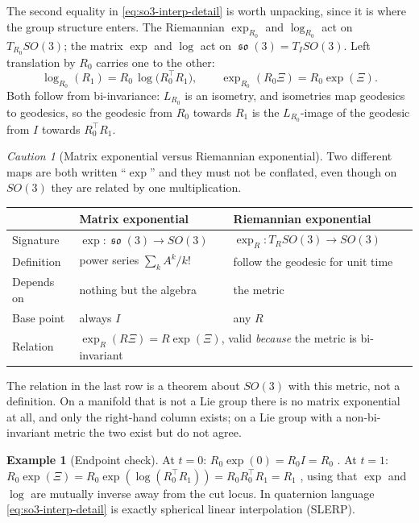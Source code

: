 \documentclass[11pt,a4paper]{report}
\theoremstyle{definition}
\newtheorem{example}[example]{Example}
\theoremstyle{remark}
\newtheorem{caution}[caution]{Caution}
\DeclareMathOperator{\so}{\mathfrak{so}}
\begin{document}
The second equality in \eqref{eq:so3-interp-detail} is worth unpacking,
since it is where the group structure enters. The Riemannian
$\exp_{R_0}$ and $\log_{R_0}$ act on $T_{R_0}SO(3)$; the matrix $\exp$ and
$\log$ act on $\so(3)=T_ISO(3)$. Left translation by $R_0$ carries one to
the other:
\[
\log_{R_0}(R_1) = R_0\,\log\bigl(R_0^\top R_1\bigr) ,
\qquad
\exp_{R_0}(R_0\Xi) = R_0\exp(\Xi) .
\]
Both follow from bi-invariance: $L_{R_0}$ is an isometry, and isometries
map geodesics to geodesics, so the geodesic from $R_0$ towards $R_1$ is the
$L_{R_0}$-image of the geodesic from $I$ towards $R_0^\top R_1$.

\begin{caution}[Matrix exponential versus Riemannian exponential]
\label{caution:two-exponentials}
Two different maps are both written ``$\exp$'' and they must not be
conflated, even though on $SO(3)$ they are related by one multiplication.
\begin{center}
\begin{tabular}{lll}
\toprule
& Matrix exponential & Riemannian exponential \\
\midrule
Signature & $\exp:\so(3)\to SO(3)$ & $\exp_R:T_RSO(3)\to SO(3)$ \\
Definition & power series $\sum_k A^k/k!$ & follow the geodesic for unit time \\
Depends on & nothing but the algebra & the metric \\
Base point & always $I$ & any $R$ \\
Relation & \multicolumn{2}{p{8.6cm}}{$\exp_R(R\Xi)=R\exp(\Xi)$, valid \emph{because} the metric is bi-invariant} \\
\bottomrule
\end{tabular}
\end{center}
The relation in the last row is a theorem about $SO(3)$ with this metric,
not a definition. On a manifold that is not a Lie group there is no matrix
exponential at all, and only the right-hand column exists; on a Lie group
with a non-bi-invariant metric the two exist but do not agree.
\end{caution}

\begin{example}[Endpoint check]
\label{ex:so3-endpoints}
At $t=0$: $R_0\exp(0)=R_0I=R_0$ \checkmark. At $t=1$:
$R_0\exp(\Xi)=R_0\exp(\log(R_0^\top R_1))=R_0R_0^\top R_1=R_1$ \checkmark,
using that $\exp$ and $\log$ are mutually inverse away from the cut locus.
In quaternion language \eqref{eq:so3-interp-detail} is exactly spherical
linear interpolation (SLERP).
\end{example}
\end{document}
